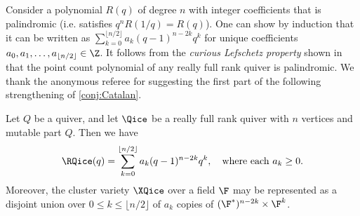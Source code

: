 Consider a polynomial $R(q)$ of degree $n$ with integer coefficients  that is palindromic (i.e.  satisfies $q^nR(1/q)=R(q)$). One can show by induction that it can be written as $\sum_{k=0}^{\lfloor n/2\rfloor} a_k (q-1)^{n-2k} q^k$ for unique coefficients $a_0,a_1,\dots,a_{\lfloor n/2\rfloor}\in\Z$. It follows from the \emph{curious Lefschetz property} shown in~\cite{LS} that the point count polynomial of any \Louise really full rank quiver is palindromic. We thank the anonymous referee for suggesting the first part of the following strengthening of \cref{conj:Catalan}. 
\begin{conjecture}
Let $Q$ be a \Louise quiver, and let $\Qice$ be a really full rank quiver with $n$ vertices and mutable part $Q$. Then we have 
\begin{equation*}%
  \RQice(q) = \sum_{k=0}^{\lfloor n/2\rfloor} a_k (q-1)^{n-2k} q^k, \quad\text{where each $a_k \geq0$.}
\end{equation*}
Moreover, the cluster variety $\XQice$ over a field $\F$ may be represented as a disjoint union over $0\leq k\leq\lfloor n/2\rfloor$ of $a_k$ copies of $(\F^\ast)^{n-2k} \times\F^k$.
\end{conjecture}
